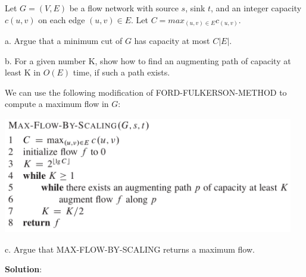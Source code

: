\documentclass{article}
\begin{document}
Let $G=(V, E)$ be a flow network with source $s$, sink $t$, and an integer capacity $c(u, v)$ on each edge $(u, v)\in{E}$. Let $C=max_{(u,v)\in{E}}c_{(u,v)}$.

a. Argue that a minimum cut of $G$ has capacity at most $C|E|$.

b. For a given number K, show how to find an augmenting path of capacity at least K in $O(E)$ time, if such a path exists.

We can use the following modification of FORD-FULKERSON-METHOD to compute a maximum flow in $G$:

\begin{center} %
\includegraphics[width=5.00in,height=2.00in]{hw5_1.png}
\end{center}


c. Argue that MAX-FLOW-BY-SCALING returns a maximum flow.\newline

\textbf{Solution}:
\end{document}
